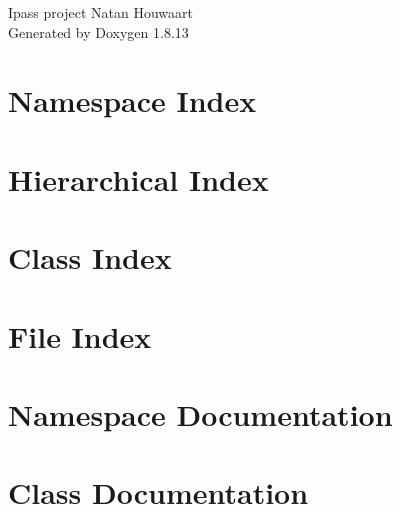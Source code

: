 \documentclass[twoside]{book}
\newcommand{\+}{\discretionary{\mbox{\scriptsize$\hookleftarrow$}}{}{}}
\newcommand{\clearemptydoublepage}{%
  \newpage{\pagestyle{empty}\cleardoublepage}%
}
\begin{document}
\hypersetup{pageanchor=false,
             bookmarksnumbered=true,
             pdfencoding=unicode
            }
\begin{titlepage}
\vspace*{7cm}
\begin{center}%
{\Large Ipass project Natan Houwaart }\\
\vspace*{1cm}
{\large Generated by Doxygen 1.8.13}\\
\end{center}
\end{titlepage}
\clearemptydoublepage
{}
\tableofcontents
\clearemptydoublepage
{}
\hypersetup{pageanchor=true}

\chapter{Namespace Index}

\chapter{Hierarchical Index}

\chapter{Class Index}

\chapter{File Index}

\chapter{Namespace Documentation}






\chapter{Class Documentation}



















\end{document}
